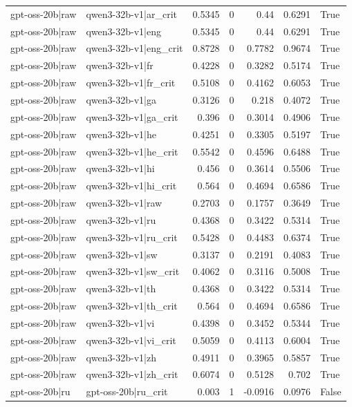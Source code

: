\begin{table}
\begin{tabular}{l l r r r r l}
gpt-oss-20b|raw & qwen3-32b-v1|ar_crit & 0.5345 & 0 & 0.44 & 0.6291 & True \\
gpt-oss-20b|raw & qwen3-32b-v1|eng & 0.5345 & 0 & 0.44 & 0.6291 & True \\
gpt-oss-20b|raw & qwen3-32b-v1|eng_crit & 0.8728 & 0 & 0.7782 & 0.9674 & True \\
gpt-oss-20b|raw & qwen3-32b-v1|fr & 0.4228 & 0 & 0.3282 & 0.5174 & True \\
gpt-oss-20b|raw & qwen3-32b-v1|fr_crit & 0.5108 & 0 & 0.4162 & 0.6053 & True \\
gpt-oss-20b|raw & qwen3-32b-v1|ga & 0.3126 & 0 & 0.218 & 0.4072 & True \\
gpt-oss-20b|raw & qwen3-32b-v1|ga_crit & 0.396 & 0 & 0.3014 & 0.4906 & True \\
gpt-oss-20b|raw & qwen3-32b-v1|he & 0.4251 & 0 & 0.3305 & 0.5197 & True \\
gpt-oss-20b|raw & qwen3-32b-v1|he_crit & 0.5542 & 0 & 0.4596 & 0.6488 & True \\
gpt-oss-20b|raw & qwen3-32b-v1|hi & 0.456 & 0 & 0.3614 & 0.5506 & True \\
gpt-oss-20b|raw & qwen3-32b-v1|hi_crit & 0.564 & 0 & 0.4694 & 0.6586 & True \\
gpt-oss-20b|raw & qwen3-32b-v1|raw & 0.2703 & 0 & 0.1757 & 0.3649 & True \\
gpt-oss-20b|raw & qwen3-32b-v1|ru & 0.4368 & 0 & 0.3422 & 0.5314 & True \\
gpt-oss-20b|raw & qwen3-32b-v1|ru_crit & 0.5428 & 0 & 0.4483 & 0.6374 & True \\
gpt-oss-20b|raw & qwen3-32b-v1|sw & 0.3137 & 0 & 0.2191 & 0.4083 & True \\
gpt-oss-20b|raw & qwen3-32b-v1|sw_crit & 0.4062 & 0 & 0.3116 & 0.5008 & True \\
gpt-oss-20b|raw & qwen3-32b-v1|th & 0.4368 & 0 & 0.3422 & 0.5314 & True \\
gpt-oss-20b|raw & qwen3-32b-v1|th_crit & 0.564 & 0 & 0.4694 & 0.6586 & True \\
gpt-oss-20b|raw & qwen3-32b-v1|vi & 0.4398 & 0 & 0.3452 & 0.5344 & True \\
gpt-oss-20b|raw & qwen3-32b-v1|vi_crit & 0.5059 & 0 & 0.4113 & 0.6004 & True \\
gpt-oss-20b|raw & qwen3-32b-v1|zh & 0.4911 & 0 & 0.3965 & 0.5857 & True \\
gpt-oss-20b|raw & qwen3-32b-v1|zh_crit & 0.6074 & 0 & 0.5128 & 0.702 & True \\
gpt-oss-20b|ru & gpt-oss-20b|ru_crit & 0.003 & 1 & -0.0916 & 0.0976 & False \\

\end{tabular}
\end{table}

